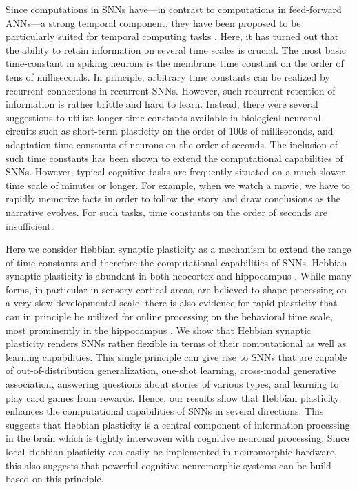 \documentclass{article}
\begin{document}
Since computations in SNNs have---in contrast to computations in feed-forward \glspl{ANN}---a strong temporal component, they have been proposed to be particularly suited for temporal computing tasks \cite{salaj2021spike}. Here, it has turned out that the ability to retain information on several time scales is crucial. The most basic time-constant in spiking neurons is the membrane time constant on the order of tens of milliseconds. In principle, arbitrary time constants can be realized by recurrent connections in recurrent SNNs. However, such recurrent retention of information is rather brittle and hard to learn. Instead, there were several suggestions to utilize longer time constants available in biological neuronal circuits such as short-term plasticity \cite{maass2002real,mongillo2008synaptic} on the order of 100s of milliseconds, and adaptation time constants of neurons \cite{bellec2018long,salaj2021spike} on the order of seconds. The inclusion of such time constants has been shown to extend the computational capabilities of SNNs. However, typical cognitive tasks are frequently situated on a much slower time scale of minutes or longer. For example, when we watch a movie, we have to rapidly memorize facts in order to follow the story and draw conclusions as the narrative evolves. For such tasks, time constants on the order of seconds are insufficient. 

Here we consider Hebbian synaptic plasticity \cite{hebb2005organization} as a mechanism to extend the range of time constants and therefore the computational capabilities of SNNs. Hebbian synaptic plasticity is abundant in both neocortex and hippocampus \cite{bliss1973long,malenka1999long,rioult2000learning}. While many forms, in particular in sensory cortical areas, are believed to shape processing on a very slow developmental scale, there is also evidence for rapid plasticity that can in principle be utilized for online processing on the behavioral time scale, most prominently in the hippocampus \cite{bittner2017behavioral,zhao2022rapid}. We show that Hebbian synaptic plasticity renders SNNs rather flexible in terms of their computational as well as learning capabilities. This single principle can give rise to SNNs that are capable of out-of-distribution generalization, one-shot learning, cross-modal generative association, answering questions about stories of various types, and learning to play card games from rewards. Hence, our results show that Hebbian plasticity enhances the computational capabilities of SNNs in several directions. This suggests that Hebbian plasticity is a central component of information processing in the brain which is tightly interwoven with cognitive neuronal processing. Since local Hebbian plasticity can easily be implemented in neuromorphic hardware, this also suggests that powerful cognitive neuromorphic systems can be build based on this principle.
\end{document}
